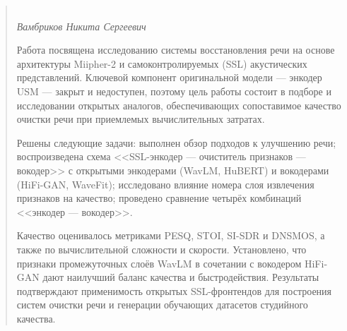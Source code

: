 \begin{abstract}

    \begin{center}
        \large{} \\
    \large\textit{Вамбриков Никита Сергеевич} \\[1cm]
    \end{center}

    Работа посвящена исследованию системы восстановления речи на основе
    архитектуры Miipher-2 и самоконтролируемых (SSL) акустических
    представлений. Ключевой компонент оригинальной модели — энкодер USM —
    закрыт и недоступен, поэтому цель работы состоит в подборе и исследовании
    открытых аналогов, обеспечивающих сопоставимое качество очистки речи при
    приемлемых вычислительных затратах.

    Решены следующие задачи: выполнен обзор подходов к улучшению речи;
    воспроизведена схема <<SSL-энкодер — очиститель признаков — вокодер>> с
    открытыми энкодерами (WavLM, HuBERT) и вокодерами (HiFi-GAN, WaveFit);
    исследовано влияние номера слоя извлечения признаков на качество; проведено
    сравнение четырёх комбинаций <<энкодер — вокодер>>.

    Качество оценивалось метриками PESQ, STOI, SI-SDR и DNSMOS, а также по
    вычислительной сложности и скорости. Установлено, что признаки промежуточных
    слоёв WavLM в сочетании с вокодером HiFi-GAN дают наилучший баланс качества
    и быстродействия. Результаты подтверждают применимость открытых
    SSL-фронтендов для построения систем очистки речи и генерации обучающих
    датасетов студийного качества.

    \vfill

\end{abstract}
